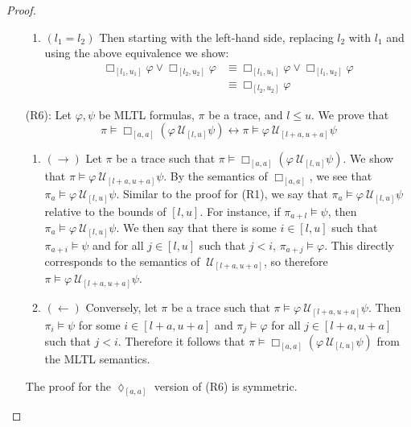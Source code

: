 \documentclass{article}
\begin{document}
\begin{proof}
\begin{enumerate}
\begin{enumerate}
    \item  $(l_1 = l_2)$
        Then starting with the left-hand side, replacing $l_2$ with $l_1$ and using the above equivalence we show:
        \begin{align*}
            \Box_{[l_1,u_1]}{\varphi} \lor \Box_{[l_2,u_2]}{\varphi} & \equiv \Box_{[l_1,u_1]}{\varphi} \lor \Box_{[l_1,u_2]}{\varphi} \\
            & \equiv \Box_{[l_2,u_2]}{\varphi}
        \end{align*}
    
    \end{enumerate}

    \item[(R6):] Let $\varphi,\psi$ be MLTL formulas, $\pi$ be a trace, and $l \leq u$. We prove that 
$$
\pi \models \Box_{[a,a]}(\varphi\ \mathcal{U}_{[l,u]} \psi) \leftrightarrow \pi \models  \varphi\ \mathcal{U}_{[l+a,u+a]} \psi
$$

    \begin{enumerate}
    \item  $(\rightarrow)$
        Let $\pi$ be a trace such that $\pi \models \Box_{[a,a]}{({\varphi}\ \mathcal{U}_{[l,u]}{\psi})}$. We show that $\pi \models {\varphi}\ \mathcal{U}_{[l+a,u+a]}{\psi}$.
        By the semantics of $\Box_{[a,a]}{}$, we see that $\pi_a \models {\varphi}\ \mathcal{U}_{[l,u]}{\psi}$.
        Similar to the proof for (R1), we say that $\pi_a \models {\varphi}\ \mathcal{U}_{[l,u]}{\psi}$ relative to the bounds of $[l,u]$.
        For instance, if $\pi_{a+l} \models \psi$, then $\pi_a \models {\varphi}\ \mathcal{U}_{[l,u]}{\psi}$.
        We then say that there is some $i \in [l,u]$ such that $\pi_{a+i} \models \psi$ and for all $j \in [l,u]$ such that $j < i$, $\pi_{a+j} \models \varphi$.
        This directly corresponds to the semantics of $\ \mathcal{U}_{[l+a,u+a]}{}$, so therefore $\pi \models {\varphi}\ \mathcal{U}_{[l+a,u+a]}{\psi}$.
    
    \item  $(\leftarrow)$
        Conversely, let $\pi$ be a trace such that $\pi \models {\varphi}\ \mathcal{U}_{[l+a,u+a]}{\psi}$.
        Then $\pi_i \models \psi$ for some $i \in [l+a,u+a]$ and $\pi_j \models \varphi$ for all $j \in [l+a,u+a]$ such that $j < i$.
        Therefore it follows that $\pi \models \Box_{[a,a]}{({\varphi}\ \mathcal{U}_{[l,u]}{\psi})}$ from the MLTL semantics.
    
    \end{enumerate}

The proof for the $\lozenge_{[a,a]}$ version of (R6) is symmetric.


\end{enumerate}
\end{proof}
\end{document}
